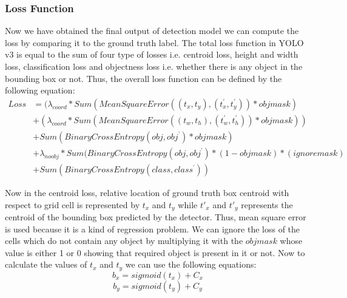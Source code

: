 \subsubsection*{Loss Function}
Now we have obtained the final output of detection model we can compute the loss by comparing it to the ground truth label. The total loss function in YOLO v3 is equal to the sum of four type of losses i.e. centroid loss, height and width loss, classification loss and objectness loss i.e. whether there is any object in the bounding box or not. Thus, the overall loss function can be defined by the following equation:
\begin{equation}
\begin{split}
    Loss &= (\lambda_{coord} * Sum(Mean Square Error((t_x,t_y),                 (t_x^{'},t_y^{'}))*obj mask) \\
   &+(\lambda_{coord} * Sum(Mean Square Error((t_w,t_h), (t_w^{'},t_h^{'}))*obj mask) ) \\
   &+ Sum(Binary Cross Entropy(obj, obj^{’}) * obj mask)\\
   &+ \lambda_{noobj} * Sum(Binary Cross Entropy(obj, obj^{’}) * (1 -obj mask)*(ignore mask) \\
   &+ Sum(Binary Cross Entropy(class, class^{’}))
\end{split}
\end{equation}

Now in the centroid loss, relative location of ground truth box centroid with respect to grid cell is represented by $t_{x}$ and $t_{y}$ while $t'_{x}$ and $t'_{y}$ represents the centroid of the bounding box predicted by the detector. Thus, mean square error is used because it is a kind of regression problem. We can ignore the loss of the cells which do not contain any object by multiplying it with the $objmask$ whose value is either 1 or 0 showing that required object is present in it or not. Now to calculate the values of $t_{x}$ and $t_{y}$ we can use the following equations:
\begin{equation}
    b_x = sigmoid(t_x) + C_x
\end{equation}
\begin{equation}
    b_y = sigmoid(t_y) + C_y
\end{equation}

